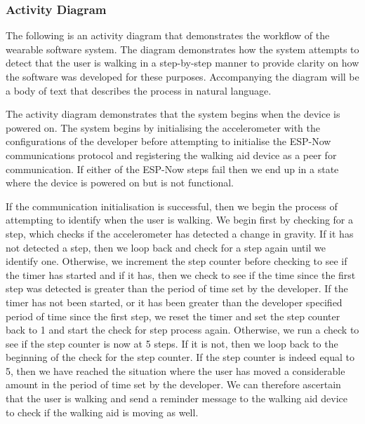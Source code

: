                         \newpage
        
                    \subsubsection{Activity Diagram}
                    \label{subsubsec:wearable_activity}
        
                        The following is an activity diagram that demonstrates the workflow of the wearable software system. The diagram demonstrates how the system attempts to detect that the user is walking in a step-by-step manner to provide clarity on how the software was developed for these purposes. Accompanying the diagram will be a body of text that describes the process in natural language.
        
                        
        
                        The activity diagram demonstrates that the system begins when the device is powered on. The system begins by initialising the accelerometer with the configurations of the developer before attempting to initialise the ESP-Now communications protocol and registering the walking aid device as a peer for communication. If either of the ESP-Now steps fail then we end up in a state where the device is powered on but is not functional. 
        
                        If the communication initialisation is successful, then we begin the process of attempting to identify when the user is walking. We begin first by checking for a step, which checks if the accelerometer has detected a change in gravity. If it has not detected a step, then we loop back and check for a step again until we identify one. Otherwise, we increment the step counter before checking to see if the timer has started and if it has, then we check to see if the time since the first step was detected is greater than the period of time set by the developer. If the timer has not been started, or it has been greater than the developer specified period of time since the first step, we reset the timer and set the step counter back to 1 and start the check for step process again. Otherwise, we run a check to see if the step counter is now at 5 steps. If it is not, then we loop back to the beginning of the check for the step counter. If the step counter is indeed equal to 5, then we have reached the situation where the user has moved a considerable amount in the period of time set by the developer. We can therefore ascertain that the user is walking and send a reminder message to the walking aid device to check if the walking aid is moving as well.
        
